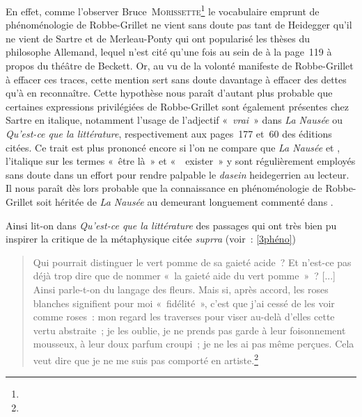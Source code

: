 \documentclass[12pt, a4paper]{article}
\begin{document}
En effet, comme l'observer Bruce~\textsc{Morissette}\footnote{
} le vocabulaire emprunt de phénoménologie de Robbe-Grillet ne vient sans doute pas tant de Heidegger qu'il ne vient de Sartre et de Merleau-Ponty qui ont popularisé les thèses du philosophe Allemand, lequel n'est cité qu'une fois au sein de \punr{} à la page~119 à propos du théâtre de Beckett. Or, au vu de la volonté manifeste de Robbe-Grillet à effacer ces traces, cette mention sert sans doute davantage à effacer des dettes qu'à en reconnaître. Cette hypothèse nous paraît d'autant plus probable que certaines expressions privilégiées de Robbe-Grillet sont également présentes chez Sartre en italique, notamment l'usage de l'adjectif «~\textit{vrai}~» dans \textit{La Nausée} ou \textit{Qu'est-ce que la littérature}, respectivement aux pages~177 et~60 des éditions citées. Ce trait est plus prononcé encore si l'on ne compare que \textit{La Nausée} et \punr, l'italique sur les termes «~être là~» et «~~exister~» y sont régulièrement employés sans doute dans un effort pour rendre palpable le \textit{dasein} heidegerrien au lecteur. Il nous paraît dès lors probable que la connaissance en phénoménologie de Robbe-Grillet soit héritée de \textit{La Nausée} au demeurant longuement commenté dans \punr.

Ainsi lit-on dans \textit{Qu'est-ce que la littérature} des passages qui ont très bien pu inspirer la critique de la métaphysique citée \textit{suprra} (voir~: \ref{3phéno})
\begin{quote}
    Qui pourrait distinguer le vert pomme de sa gaieté acide~? Et n'est-ce pas déjà trop dire que de nommer «~la gaieté aide du vert pomme~»~? [...] Ainsi parle-t-on du langage des fleurs. Mais si, après accord, les roses blanches signifient pour moi «~fidélité~», c'est que j'ai cessé de les voir comme roses~: mon regard les traverses pour viser au-delà d'elles cette vertu abstraite~; je les oublie, je ne prends pas garde à leur foisonnement mousseux, à leur doux parfum croupi~; je ne les ai pas même perçues. Cela veut dire que je ne me suis pas comporté en artiste.\footnote{}
\end{quote}
\end{document}
